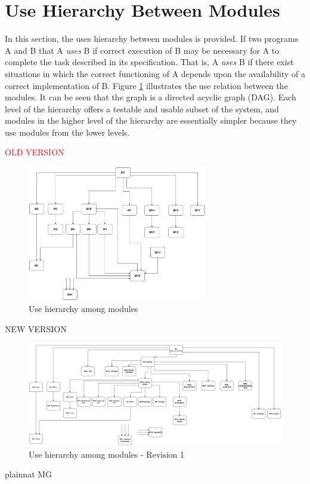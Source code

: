 \documentclass[12pt, titlepage]{article}
\begin{document}
\section{Use Hierarchy Between Modules} \label{SecUse}

In this section, the uses hierarchy between modules is
provided. If two programs A and B that A {\em uses} B if
correct execution of B may be necessary for A to complete the task described in
its specification. That is, A {\em uses} B if there exist situations in which
the correct functioning of A depends upon the availability of a correct
implementation of B.  Figure \ref{FigUH} illustrates the use relation between
the modules. It can be seen that the graph is a directed acyclic graph
(DAG). Each level of the hierarchy offers a testable and usable subset of the
system, and modules in the higher level of the hierarchy are essentially simpler
because they use modules from the lower levels.

\textcolor{red}{OLD VERSION}
\begin{figure}[H]
\centering
\includegraphics[width=0.7\textwidth]{UsesHierarchy.png}
\caption{Use hierarchy among modules}
\label{FigUH}
\end{figure}
\color{red}
\newpage
NEW VERSION
\begin{figure}[H]
\centering
\includegraphics[width=1\textwidth]{Uses Hierarchy - 3XA3.png}
\caption{Use hierarchy among modules - Revision 1}
\label{FigUH2}
\end{figure}
\color{black}


 {plainnat}
 {MG}
\end{document}
